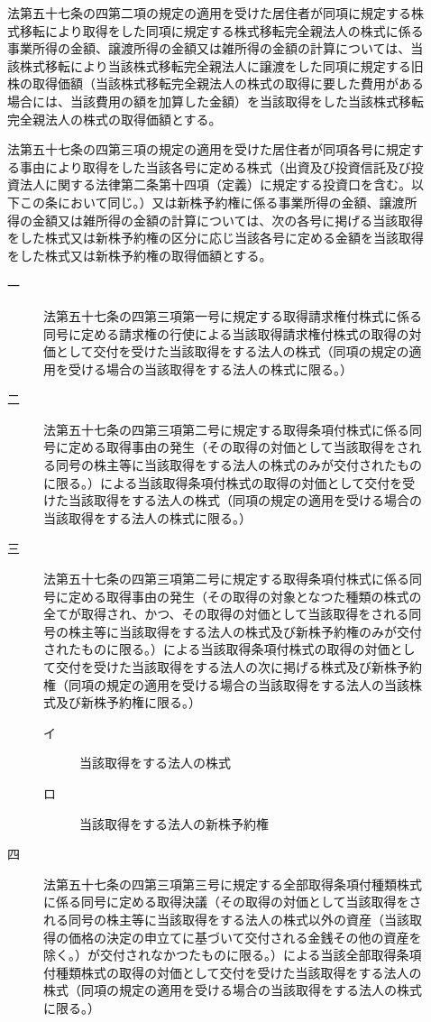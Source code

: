 \documentclass[twocolumn,a4j,10pt]{ltjtarticle}
\begin{document}
\begin{description}
\item[]法第五十七条の四第二項の規定の適用を受けた居住者が同項に規定する株式移転により取得をした同項に規定する株式移転完全親法人の株式に係る事業所得の金額、譲渡所得の金額又は雑所得の金額の計算については、当該株式移転により当該株式移転完全親法人に譲渡をした同項に規定する旧株の取得価額（当該株式移転完全親法人の株式の取得に要した費用がある場合には、当該費用の額を加算した金額）を当該取得をした当該株式移転完全親法人の株式の取得価額とする。
\item[]法第五十七条の四第三項の規定の適用を受けた居住者が同項各号に規定する事由により取得をした当該各号に定める株式（出資及び投資信託及び投資法人に関する法律第二条第十四項（定義）に規定する投資口を含む。以下この条において同じ。）又は新株予約権に係る事業所得の金額、譲渡所得の金額又は雑所得の金額の計算については、次の各号に掲げる当該取得をした株式又は新株予約権の区分に応じ当該各号に定める金額を当該取得をした株式又は新株予約権の取得価額とする。
\begin{description}
\item[一]法第五十七条の四第三項第一号に規定する取得請求権付株式に係る同号に定める請求権の行使による当該取得請求権付株式の取得の対価として交付を受けた当該取得をする法人の株式（同項の規定の適用を受ける場合の当該取得をする法人の株式に限る。）
\item[二]法第五十七条の四第三項第二号に規定する取得条項付株式に係る同号に定める取得事由の発生（その取得の対価として当該取得をされる同号の株主等に当該取得をする法人の株式のみが交付されたものに限る。）による当該取得条項付株式の取得の対価として交付を受けた当該取得をする法人の株式（同項の規定の適用を受ける場合の当該取得をする法人の株式に限る。）
\item[三]法第五十七条の四第三項第二号に規定する取得条項付株式に係る同号に定める取得事由の発生（その取得の対象となつた種類の株式の全てが取得され、かつ、その取得の対価として当該取得をされる同号の株主等に当該取得をする法人の株式及び新株予約権のみが交付されたものに限る。）による当該取得条項付株式の取得の対価として交付を受けた当該取得をする法人の次に掲げる株式及び新株予約権（同項の規定の適用を受ける場合の当該取得をする法人の当該株式及び新株予約権に限る。）
\begin{description}
\item[イ]当該取得をする法人の株式
\item[ロ]当該取得をする法人の新株予約権
\end{description}
\item[四]法第五十七条の四第三項第三号に規定する全部取得条項付種類株式に係る同号に定める取得決議（その取得の対価として当該取得をされる同号の株主等に当該取得をする法人の株式以外の資産（当該取得の価格の決定の申立てに基づいて交付される金銭その他の資産を除く。）が交付されなかつたものに限る。）による当該全部取得条項付種類株式の取得の対価として交付を受けた当該取得をする法人の株式（同項の規定の適用を受ける場合の当該取得をする法人の株式に限る。）

\end{description}
\end{description}
\end{document}

